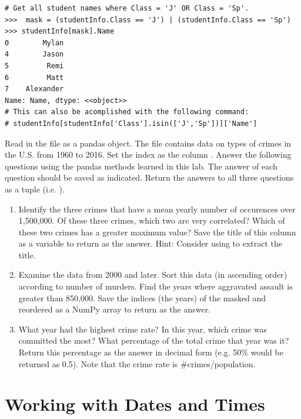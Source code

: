 \begin{lstlisting}
# Get all student names where Class = 'J' OR Class = 'Sp'.
>>>  mask = (studentInfo.Class == 'J') | (studentInfo.Class == 'Sp')
>>> studentInfo[mask].Name
0        Mylan
4        Jason
5         Remi
6         Matt
7    Alexander
Name: Name, dtype: <<object>>
# This can also be acomplished with the following command:
# studentInfo[studentInfo['Class'].isin(['J','Sp'])]['Name']
\end{lstlisting}

\begin{problem}\label{prob:rate}
Read in the file  as a pandas object.
The file contains data on types of crimes in the U.S. from 1960 to 2016.
Set the index as the column .
Answer the following questions using the pandas methods learned in this lab.
The answer of each question should be saved as indicated.
Return the answers to all three questions as a tuple (i.e. ).

\begin{enumerate}
	\item Identify the three crimes that have a mean yearly number of occurences over 1,500,000.
	Of these three crimes, which two are very correlated?
	Which of these two crimes has a greater maximum value?
	Save the title of this column as a variable to return as the answer.
	Hint: Consider using  to extract the title.
	\item Examine the data from 2000 and later.
	Sort this data (in ascending order) according to number of murders.
	Find the years where aggravated assault is greater than 850,000.
   Save the indices (the years) of the masked and reordered  as a NumPy array to return as the answer.
	\item What year had the highest crime rate?
	In this year, which crime was committed the most?
	What percentage of the total crime that year was it?
	Return this percentage as the answer in decimal form (e.g. 50\% would be returned as 0.5).
	Note that the crime rate is \#crimes/population. 
\end{enumerate}
\end{problem}


\section*{Working with Dates and Times} %

